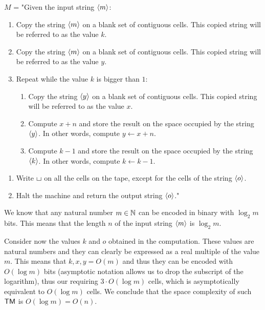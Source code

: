 $M$ = "Given the input string $\left\langle m\right\rangle$:
    \begin{enumerate}
        \item Copy the string $\left\langle m\right\rangle$ on a blank set of contiguous cells. This copied string will be referred to as the value $k$.
        \item Copy the string $\left\langle m\right\rangle$ on a blank set of contiguous cells. This copied string will be referred to as the value $y$.
        \item Repeat while the value $k$ is bigger than $1$:
        \begin{enumerate}[label={\arabic*.}, start=3]
            \item Copy the string $\left\langle y\right\rangle$ on a blank set of contiguous cells. This copied string will be referred to as the value $x$.
            \item Compute $x + n$ and store the result on the space occupied by the string $\left\langle y\right\rangle$. In other words, compute $y \gets x + n$.
            \item Compute $k - 1$ and store the result on the space occupied by the string $\left\langle k\right\rangle$. In other words, compute $k \gets k - 1$.
        \end{enumerate}
    \end{enumerate}
    \begin{enumerate}[label={\arabic*.}, start=6]
        \item Write $\blankchar$ on all the cells on the tape, except for the cells of the string $\left\langle o\right\rangle$.
        \item Halt the machine and return the output string $\left\langle o\right\rangle$."
    \end{enumerate}

 We know that any natural number $m \in \mathbb{N}$ can be encoded in binary with $\log_2 m$ bits. This means that the length $n$ of the input string $\left\langle m\right\rangle$ is $\log_2 m$.
    
 Consider now the values $k$ and $o$ obtained in the computation. These values are natural numbers and they can clearly be expressed as a real multiple of the value $m$. This means that $k, x, y = O(m)$ and thus they can be encoded with $O(\log m)$ bits (asymptotic notation allows us to drop the subscript of the logarithm), thus our requiring $3 \cdot O(\log m)$ cells, which is asymptotically equivalent to $O(\log m)$ cells. We conclude that the space complexity of such $\textsf{TM}$ is $O(\log m) = O(n)$.

